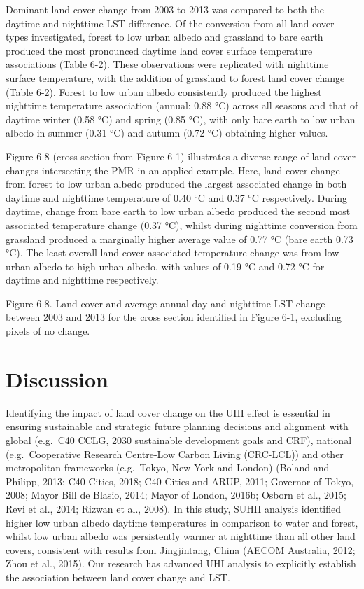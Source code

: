 \documentclass[]{book}
\begin{document}
Dominant land cover change from 2003 to 2013 was compared to both the
daytime and nighttime LST difference. Of the conversion from all land
cover types investigated, forest to low urban albedo and grassland to
bare earth produced the most pronounced daytime land cover surface
temperature associations (Table 6-2). These observations were replicated
with nighttime surface temperature, with the addition of grassland to
forest land cover change (Table 6-2). Forest to low urban albedo
consistently produced the highest nighttime temperature association
(annual: 0.88 °C) across all seasons and that of daytime winter (0.58
°C) and spring (0.85 °C), with only bare earth to low urban albedo in
summer (0.31 °C) and autumn (0.72 °C) obtaining higher values.

Figure 6-8 (cross section from Figure 6-1) illustrates a diverse range
of land cover changes intersecting the PMR in an applied example. Here,
land cover change from forest to low urban albedo produced the largest
associated change in both daytime and nighttime temperature of 0.40 °C
and 0.37 °C respectively. During daytime, change from bare earth to low
urban albedo produced the second most associated temperature change
(0.37 °C), whilst during nighttime conversion from grassland produced a
marginally higher average value of 0.77 °C (bare earth 0.73 °C). The
least overall land cover associated temperature change was from low
urban albedo to high urban albedo, with values of 0.19 °C and 0.72 °C
for daytime and nighttime respectively.

Figure 6-8. Land cover and average annual day and nighttime LST change
between 2003 and 2013 for the cross section identified in Figure 6-1,
excluding pixels of no change.

\section{Discussion}\label{discussion-2}

Identifying the impact of land cover change on the UHI effect is
essential in ensuring sustainable and strategic future planning
decisions and alignment with global (e.g.~C40 CCLG, 2030 sustainable
development goals and CRF), national (e.g.~Cooperative Research
Centre-Low Carbon Living (CRC-LCL)) and other metropolitan frameworks
(e.g.~Tokyo, New York and London) (Boland and Philipp, 2013; C40 Cities,
2018; C40 Cities and ARUP, 2011; Governor of Tokyo, 2008; Mayor Bill de
Blasio, 2014; Mayor of London, 2016b; Osborn et al., 2015; Revi et al.,
2014; Rizwan et al., 2008). In this study, SUHII analysis identified
higher low urban albedo daytime temperatures in comparison to water and
forest, whilst low urban albedo was persistently warmer at nighttime
than all other land covers, consistent with results from Jingjintang,
China (AECOM Australia, 2012; Zhou et al., 2015). Our research has
advanced UHI analysis to explicitly establish the association between
land cover change and LST.
\end{document}
